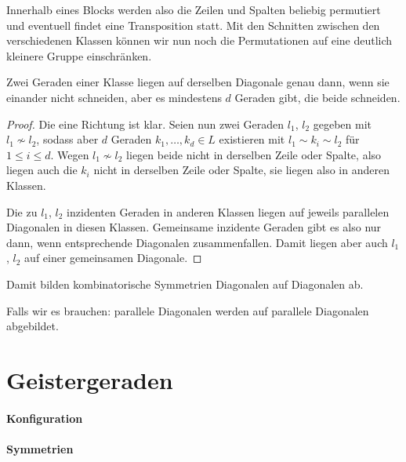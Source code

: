 Innerhalb eines Blocks werden also die Zeilen und Spalten beliebig permutiert und eventuell findet eine Transposition statt. Mit den Schnitten zwischen den verschiedenen Klassen können wir nun noch die Permutationen auf eine deutlich kleinere Gruppe einschränken.
\begin{prop}
Zwei Geraden einer Klasse liegen auf derselben Diagonale genau dann, wenn sie einander nicht schneiden, aber es mindestens $d$ Geraden gibt, die beide schneiden.
\end{prop}
\begin{proof}
Die eine Richtung ist klar. Seien nun zwei Geraden $l_1$, $l_2$ gegeben mit $l_1 \not\sim l_2$, sodass aber $d$ Geraden $k_1, \dots, k_d \in L$ existieren mit $l_1 \sim k_i \sim l_2$ für $1 \leq i \leq d$. Wegen $l_1 \not\sim l_2$ liegen beide nicht in derselben Zeile oder Spalte, also liegen auch die $k_i$ nicht in derselben Zeile oder Spalte, sie liegen also in anderen Klassen.

Die zu $l_1$, $l_2$ inzidenten Geraden in anderen Klassen liegen auf jeweils parallelen Diagonalen in diesen Klassen. Gemeinsame inzidente Geraden gibt es also nur dann, wenn entsprechende Diagonalen zusammenfallen. Damit liegen aber auch $l_1$, $l_2$ auf einer gemeinsamen Diagonale.
\end{proof}
\begin{coroll}
Damit bilden kombinatorische Symmetrien Diagonalen auf Diagonalen ab.
\end{coroll}
\todo Falls wir es brauchen: parallele Diagonalen werden auf parallele Diagonalen abgebildet.

\section{Geistergeraden}
\paragraph{Konfiguration}
\paragraph{Symmetrien}
